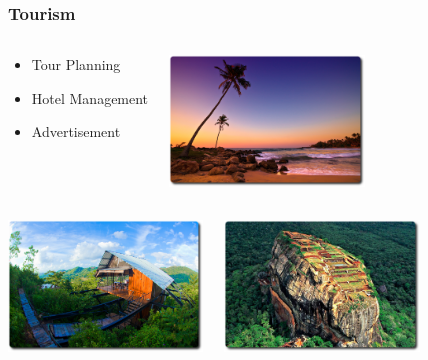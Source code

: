 \documentclass[serif,mathserif]{beamer}
\begin{document}
\begin{frame}
  \frametitle{Tourism}
\begin{columns}
\begin{center}
\begin{itemize}
 \item Tour Planning
 \item Hotel Management
 \item Advertisement
\end{itemize}
\end{center}

\begin{center}
 \includegraphics[height=3.5cm]{sri-lanka-sunset}
\end{center}
\end{columns}

\begin{columns}
\begin{center}
 \includegraphics[height=3.5cm]{the-ark}
\end{center}

\begin{center}
 \includegraphics[height=3.5cm]{SrilankaSigiriyaScaled}
\end{center}
\end{columns}
\end{frame}
\end{document}
